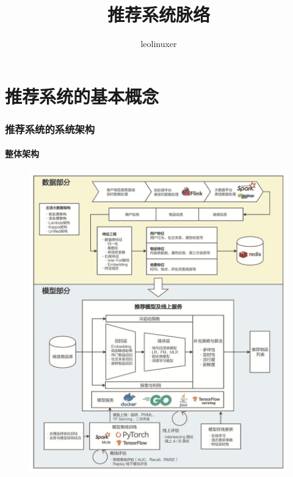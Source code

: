 \documentclass[12pt]{article}
\title{推荐系统脉络\cite{Deep_Learning_Recommender_System}\cite{Recommender_System_With_Deep_Learning_Collection}}
\author{leolinuxer}
\begin{document}
\maketitle
\tableofcontents

\part{推荐系统的基本概念}
\section{推荐系统的系统架构}
\subsection{整体架构}
\begin{figure}[H]
    \centering
    \includegraphics[width=1\textwidth]{fig/Deep_Learning_Refenrence_System_Architecture.jpg}
\end{figure}
\end{document}
